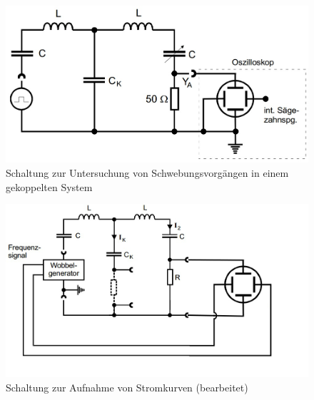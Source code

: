 \begin{figure}[h]
        \centering
        \includegraphics[scale=0.5]{Grafiken/V355Abb3.jpg}
        \caption{Schaltung zur Untersuchung von Schwebungsvorgängen in einem gekoppelten System \cite{V355}}
        \label{fig:Abb3}
\end{figure}
\begin{figure}[h]
        \centering
        \includegraphics[scale=0.5]{Grafiken/V355Abb4.jpg}
        \caption{Schaltung zur Aufnahme von Stromkurven (bearbeitet)\cite{V355}}
        \label{fig:Abb4}
\end{figure}

